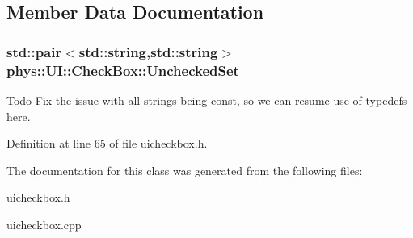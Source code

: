 \subsection{Member Data Documentation}
\hypertarget{classphys_1_1UI_1_1CheckBox_a7b670d93f119193283ec78b94f842429}{
\subsubsection[{UncheckedSet}]{\setlength{\rightskip}{0pt plus 5cm}std::pair$<$std::string,std::string$>$ {\bf phys::UI::CheckBox::UncheckedSet}}}
\label{dd/d10/classphys_1_1UI_1_1CheckBox_a7b670d93f119193283ec78b94f842429}
\begin{Desc}
\item[\hyperlink{todo__todo000025}{Todo}]Fix the issue with all strings being const, so we can resume use of typedefs here. \end{Desc}


Definition at line 65 of file uicheckbox.h.



The documentation for this class was generated from the following files:\begin{DoxyCompactItemize}
\item 
uicheckbox.h\item 
uicheckbox.cpp\end{DoxyCompactItemize}
